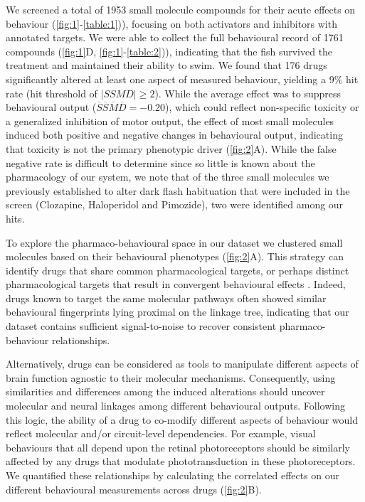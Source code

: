 \documentclass[9pt,lineno]{RandlettLab_elife}
\begin{document}
We screened a total of 1953 small molecule compounds for their acute effects on behaviour (\autoref{fig:1}-\autoref{table:1})), focusing on both activators and  inhibitors  with annotated targets. We were able to collect the full behavioural record of 1761 compounds  (\autoref{fig:1}D, \autoref{fig:1}-\autoref{table:2})), indicating that the fish survived the treatment and maintained their ability to swim. We found that 176 drugs significantly altered at least one aspect of measured behaviour, yielding a 9\% hit rate (hit threshold of $|SSMD| \geq 2$). While the average effect was to suppress behavioural output (\(\overline S \overline S \overline M \overline D = -0.20\)), which could reflect non-specific toxicity or a generalized inhibition of motor output, the effect of most small molecules  induced both positive and negative changes in behavioural output, indicating that toxicity is not the primary phenotypic driver (\autoref{fig:2}A). While the false negative rate is difficult to determine since so little is known about the pharmacology of our system, we note that of the three small molecules we previously established to alter dark flash habituation that were included in the screen (Clozapine, Haloperidol and Pimozide), two were identified among our hits. 

To explore the pharmaco-behavioural space in our dataset we clustered small molecules  based on their behavioural phenotypes (\autoref{fig:2}A). This strategy can identify drugs that share common pharmacological targets, or perhaps distinct pharmacological targets that result in convergent behavioural effects \cite{Bruni2016-nq, Rihel2010-pj}. Indeed, drugs known to target the same molecular pathways often showed similar behavioural fingerprints lying proximal on the linkage tree, indicating that our dataset contains sufficient signal-to-noise to recover consistent pharmaco-behaviour relationships. 

Alternatively, drugs can be considered  as tools to manipulate different aspects of brain function agnostic to their molecular mechanisms. Consequently,  using similarities and differences among the induced alterations should uncover molecular and neural linkages among different behavioural outputs. Following this logic, the ability of a drug to co-modify different aspects of behaviour would reflect molecular and/or circuit-level dependencies. For example, visual behaviours that all depend upon the retinal photoreceptors should be similarly affected by any drugs that modulate phototransduction in these photoreceptors. We quantified these relationships by calculating the correlated effects on our different behavioural measurements across drugs (\autoref{fig:2}B). 
\end{document}
